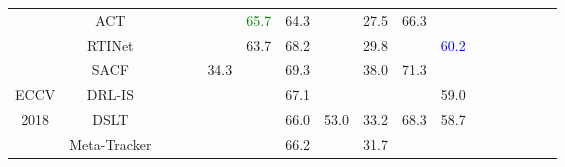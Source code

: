 \documentclass[10pt,twocolumn,letterpaper]{article}
\begin{document}
\begin{table*}[t]
\begin{tabular}{cccccccccccccccccc}
\cmidrule{2-18} \cmidrule{3-18} \cmidrule{4-18} \cmidrule{5-18} \cmidrule{6-18} \cmidrule{7-18} \cmidrule{8-18} \cmidrule{9-18} \cmidrule{10-18} \cmidrule{11-18} \cmidrule{12-18} \cmidrule{13-18} \cmidrule{14-18} \cmidrule{15-18} \cmidrule{16-18} \cmidrule{17-18} \cmidrule{18-18} 
 & ACT \cite{Chen18ECCV_Actor} &  &  &  &  & \textcolor{green}{65.7} & 64.3 &  & 27.5 & 66.3 &  &  &  &  &  &  & \tabularnewline
\cmidrule{2-18} \cmidrule{3-18} \cmidrule{4-18} \cmidrule{5-18} \cmidrule{6-18} \cmidrule{7-18} \cmidrule{8-18} \cmidrule{9-18} \cmidrule{10-18} \cmidrule{11-18} \cmidrule{12-18} \cmidrule{13-18} \cmidrule{14-18} \cmidrule{15-18} \cmidrule{16-18} \cmidrule{17-18} \cmidrule{18-18} 
 & RTINet \cite{Yao18ECCV} &  &  &  &  & 63.7 & 68.2 &  & 29.8 &  & \textcolor{blue}{60.2} &  &  &  &  &  & \tabularnewline
\cmidrule{2-18} \cmidrule{3-18} \cmidrule{4-18} \cmidrule{5-18} \cmidrule{6-18} \cmidrule{7-18} \cmidrule{8-18} \cmidrule{9-18} \cmidrule{10-18} \cmidrule{11-18} \cmidrule{12-18} \cmidrule{13-18} \cmidrule{14-18} \cmidrule{15-18} \cmidrule{16-18} \cmidrule{17-18} \cmidrule{18-18} 
 & SACF \cite{Zhang18ECCV_Aligned} &  &  &  & 34.3 &  & 69.3 &  & 38.0 & 71.3 &  &  &  &  &  &  & \tabularnewline
\cmidrule{2-18} \cmidrule{3-18} \cmidrule{4-18} \cmidrule{5-18} \cmidrule{6-18} \cmidrule{7-18} \cmidrule{8-18} \cmidrule{9-18} \cmidrule{10-18} \cmidrule{11-18} \cmidrule{12-18} \cmidrule{13-18} \cmidrule{14-18} \cmidrule{15-18} \cmidrule{16-18} \cmidrule{17-18} \cmidrule{18-18} 
ECCV & DRL-IS \cite{Ren18ECCV} &  &  &  &  &  & 67.1 &  &  &  & 59.0 &  &  &  &  &  & \tabularnewline
\cmidrule{2-18} \cmidrule{3-18} \cmidrule{4-18} \cmidrule{5-18} \cmidrule{6-18} \cmidrule{7-18} \cmidrule{8-18} \cmidrule{9-18} \cmidrule{10-18} \cmidrule{11-18} \cmidrule{12-18} \cmidrule{13-18} \cmidrule{14-18} \cmidrule{15-18} \cmidrule{16-18} \cmidrule{17-18} \cmidrule{18-18} 
2018 & DSLT \cite{Lu18ECCV} &  &  &  &  &  & 66.0 & 53.0 & 33.2 & 68.3 & 58.7 &  &  &  &  &  & \tabularnewline
\cmidrule{2-18} \cmidrule{3-18} \cmidrule{4-18} \cmidrule{5-18} \cmidrule{6-18} \cmidrule{7-18} \cmidrule{8-18} \cmidrule{9-18} \cmidrule{10-18} \cmidrule{11-18} \cmidrule{12-18} \cmidrule{13-18} \cmidrule{14-18} \cmidrule{15-18} \cmidrule{16-18} \cmidrule{17-18} \cmidrule{18-18} 
 & Meta-Tracker \cite{Park18ECCV} &  &  &  &  &  & 66.2 &  & 31.7 &  &  &  &  &  &  &  & \tabularnewline
\cmidrule{2-18} \cmidrule{3-18} \cmidrule{4-18} \cmidrule{5-18} \cmidrule{6-18} \cmidrule{7-18} \cmidrule{8-18} \cmidrule{9-18} \cmidrule{10-18} \cmidrule{11-18} \cmidrule{12-18} \cmidrule{13-18} \cmidrule{14-18} \cmidrule{15-18} \cmidrule{16-18} \cmidrule{17-18} \cmidrule{18-18} 

\end{tabular}
\end{table*}
\end{document}
